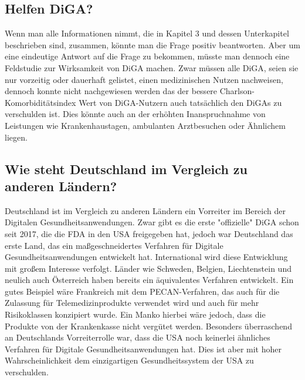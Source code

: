 \documentclass{article}
\begin{document}
		\subsection{Helfen DiGA?}
			Wenn man alle Informationen nimmt, die in Kapitel 3 und dessen Unterkapitel beschrieben sind, zusammen, könnte man die Frage positiv beantworten. Aber um eine eindeutige Antwort auf die Frage zu bekommen, müsste man dennoch eine Feldstudie zur Wirksamkeit von DiGA machen. Zwar müssen alle DiGA, seien sie nur vorzeitig oder dauerhaft gelistet, einen medizinischen Nutzen nachweisen, dennoch konnte nicht nachgewiesen werden das der bessere Charlson-Komorbiditätsindex Wert von DiGA-Nutzern auch tatsächlich den DiGAs zu verschulden ist. Dies könnte auch an der erhöhten Inanspruchnahme von Leistungen wie Krankenhaustagen, ambulanten Arztbesuchen oder Ähnlichem liegen.        
		\subsection{Wie steht Deutschland im Vergleich zu anderen Ländern?}
			Deutschland ist im Vergleich zu anderen Ländern ein Vorreiter im Bereich der Digitalen Gesundheitsanwendungen. Zwar gibt es die erste "offizielle" DiGA schon seit 2017, die die FDA in den USA freigegeben hat, jedoch war Deutschland das erste Land, das ein maßgeschneidertes Verfahren für Digitale Gesundheitsanwendungen entwickelt hat. International wird diese Entwicklung mit großem Interesse verfolgt. Länder wie Schweden, Belgien, Liechtenstein und neulich auch Österreich haben bereits ein äquivalentes Verfahren entwickelt. Ein gutes Beispiel wäre Frankreich mit dem PECAN-Verfahren, das auch für die Zulassung für Telemedizinprodukte verwendet wird und auch für mehr Risikoklassen konzipiert wurde. Ein Manko hierbei wäre jedoch, dass die Produkte von der Krankenkasse nicht vergütet werden. Besonders überraschend an Deutschlands Vorreiterrolle war, dass die USA noch keinerlei ähnliches Verfahren für Digitale Gesundheitsanwendungen hat. Dies ist aber mit hoher Wahrscheinlichkeit dem einzigartigen Gesundheitssystem der USA zu verschulden.     
\end{document}
